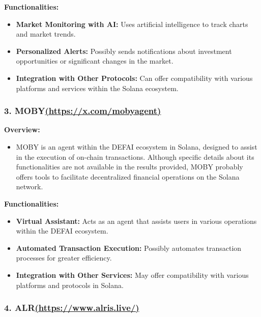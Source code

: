 \documentclass[
]{article}
\providecommand{\tightlist}{%
  \setlength{\itemsep}{0pt}\setlength{\parskip}{0pt}}
\begin{document}
\textbf{Functionalities:}

\begin{itemize}
\tightlist
\item
  \textbf{Market Monitoring with AI:} Uses artificial intelligence to
  track charts and market trends.
\item
  \textbf{Personalized Alerts:} Possibly sends notifications about
  investment opportunities or significant changes in the market.
\item
  \textbf{Integration with Other Protocols:} Can offer compatibility
  with various platforms and services within the Solana ecosystem.
\end{itemize}

\hypertarget{mobyhttpsx.commobyagent}{%
\subsubsection{\texorpdfstring{3.
MOBY\href{https://x.com/mobyagent}{(https://x.com/mobyagent)}}{3. MOBY(https://x.com/mobyagent)}}\label{mobyhttpsx.commobyagent}}

\textbf{Overview:}

\begin{itemize}
\tightlist
\item
  MOBY is an agent within the DEFAI ecosystem in Solana, designed to
  assist in the execution of on-chain transactions. Although specific
  details about its functionalities are not available in the results
  provided, MOBY probably offers tools to facilitate decentralized
  financial operations on the Solana network.
\end{itemize}

\textbf{Functionalities:}

\begin{itemize}
\tightlist
\item
  \textbf{Virtual Assistant:} Acts as an agent that assists users in
  various operations within the DEFAI ecosystem.
\item
  \textbf{Automated Transaction Execution:} Possibly automates
  transaction processes for greater efficiency.
\item
  \textbf{Integration with Other Services:} May offer compatibility with
  various platforms and protocols in Solana.
\end{itemize}

\hypertarget{alrhttpswww.alris.live}{%
\subsubsection{\texorpdfstring{4.
ALR\href{https://www.alris.live/}{(https://www.alris.live/)}}{4. ALR(https://www.alris.live/)}}\label{alrhttpswww.alris.live}}
\end{document}
